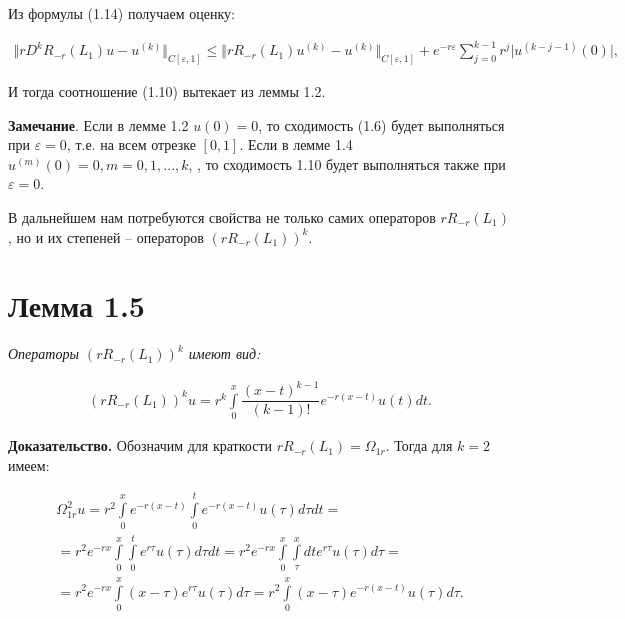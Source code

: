 Из формулы (1.14) получаем оценку:

\begin{equation}
\begin{array}{c}
\nonumber

\bigl\Vert rD^kR_{-r}(L_1)u - u^{(k)}\bigr\Vert_{C[\varepsilon ,1]} \leq \bigl\Vert rR_{-r}(L_1)u^{(k)} - u^{(k)}\bigr\Vert_{C[\varepsilon ,1]} + e^{-r\varepsilon}\sum\limits_{j=0}^{k-1} r^j\vert u^{(k-j-1)}(0)\vert,

\end{array}
\end{equation}

И тогда соотношение (1.10) вытекает из леммы 1.2.

\textbf{Замечание}. Если в лемме 1.2 $ u(0) = 0 $, то сходимость (1.6) будет выполняться при $ \varepsilon = 0$, т.е. на всем отрезке $ [0,1] $. Если в лемме 1.4 $ u^{(m)}(0) = 0, m = 0,1,...,k $, , то сходимость 1.10 будет выполняться также при $ \varepsilon = 0 $.

В дальнейшем нам потребуются свойства не только самих операторов $ rR_{-r}(L_1) $, но и их степеней – операторов $ (rR_{-r}(L_1))^k $.

\section{Лемма 1.5}
\label{lemma1.5}

\textit{Операторы $ (rR_{-r}(L_1))^k $ имеют вид:}

\begin{equation}
\begin{array}{c}

(rR_{-r}(L_1))^ku = r^k\int\limits_0^x \dfrac{(x-t)^{k-1}}{(k-1)!}e^{-r(x-t)}u(t)dt.

\end{array}
\end{equation}

\textbf{Доказательство.} Обозначим для краткости $ rR_{-r}(L_1) = \Omega_{1r} $. Тогда для $ k = 2 $ имеем:

\begin{equation}
\begin{array}{c}
\nonumber

\Omega_{1r}^2u = r^2\int\limits_0^x e^{-r(x-t)} \int\limits_0^t e^{-r(x-t)} u(\tau)d\tau dt = \\
= r^2e^{-rx}\int\limits_0^x\int\limits_0^t e^{r\tau}u(\tau)d\tau dt = r^2e^{-rx}\int\limits_0^x\int\limits_\tau^x dte^{r\tau}u(\tau)d\tau = \\
= r^2e^{-rx}\int\limits_0^x (x-\tau)e^{r\tau}u(\tau)d\tau = r^2\int\limits_0^x (x-\tau)e^{-r(x-t)}u(\tau)d\tau .

\end{array}
\end{equation}



